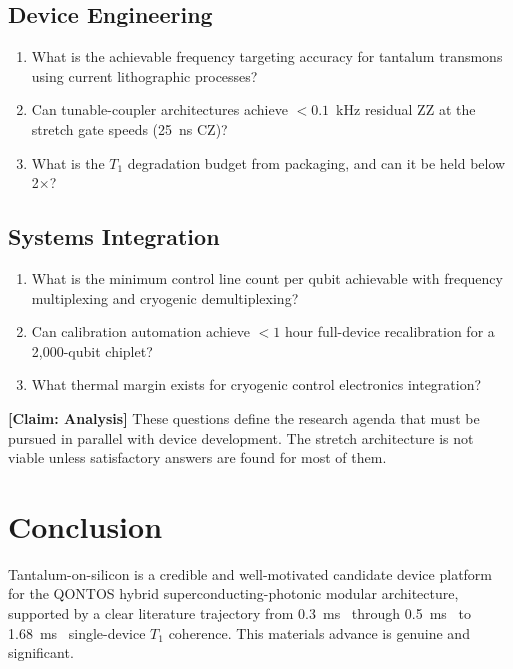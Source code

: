 \documentclass[conference]{IEEEtran}
\begin{document}
\subsection{Device Engineering}

\begin{enumerate}[resume]
\item What is the achievable frequency targeting accuracy for tantalum transmons using current lithographic processes?
\item Can tunable-coupler architectures achieve $< 0.1$~kHz residual ZZ at the stretch gate speeds (25~ns CZ)?
\item What is the $T_1$ degradation budget from packaging, and can it be held below 2$\times$?
\end{enumerate}

\subsection{Systems Integration}

\begin{enumerate}[resume]
\item What is the minimum control line count per qubit achievable with frequency multiplexing and cryogenic demultiplexing?
\item Can calibration automation achieve $< 1$ hour full-device recalibration for a 2,000-qubit chiplet?
\item What thermal margin exists for cryogenic control electronics integration?
\end{enumerate}

\textbf{[Claim: Analysis]} These questions define the research agenda that must be pursued in parallel with device development. The stretch architecture is not viable unless satisfactory answers are found for most of them.

\section{Conclusion}

Tantalum-on-silicon is a credible and well-motivated candidate device platform for the QONTOS hybrid superconducting-photonic modular architecture, supported by a clear literature trajectory from 0.3~ms~\cite{place2021} through 0.5~ms~\cite{wang2022} to 1.68~ms~\cite{bland2025} single-device $T_1$ coherence. This materials advance is genuine and significant.
\end{document}
